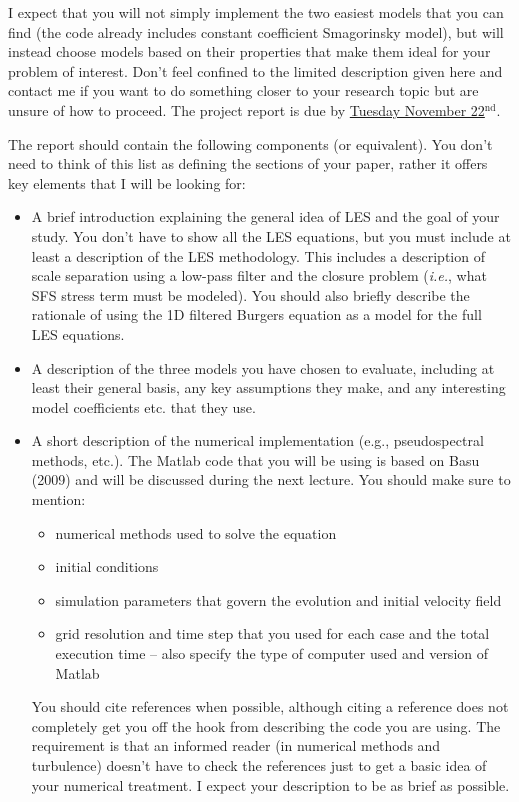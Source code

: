 \documentclass[11pt]{article}
\begin{document}
I expect that you will not simply implement the two easiest models that you can find (the code already includes constant coefficient Smagorinsky model), but will instead choose models based on their properties that make them ideal for your problem of interest. Don't feel confined to the limited description given here and contact me if you want to do something closer to your research topic but are unsure of how to proceed.   The project report is due by \underline{Tuesday November 22$^{\text{nd}}$}.

The report should contain the following components (or equivalent). You don't need to think of this list as defining the sections of your paper, rather it offers key elements that I will be looking for:
\begin{itemize}
\item A brief introduction explaining the general idea of LES and the goal of your study. You don't have to show all the LES equations, but you must include at least a description of the LES methodology. This includes a description of scale separation using a low-pass filter and the closure problem (\textit{i.e.}, what SFS stress term must be modeled). You should also briefly describe the rationale of using the 1D filtered Burgers equation as a model for the full LES equations.

\item A description of the three models you have chosen to evaluate, including at least their general basis, any key assumptions they make, and any interesting model coefficients etc. that they use.

\item A short description of the numerical implementation (e.g., pseudospectral methods, etc.).  The Matlab code that you will be using is based on Basu (2009) and will be discussed during the next lecture. You should make sure to mention:
\begin{itemize}
\item numerical methods used to solve the equation
\item initial conditions
\item simulation parameters that govern the evolution and initial velocity field
\item grid resolution and time step that you used for each case and the total execution time -- also specify the type of computer used and version of Matlab
\end{itemize}
You should cite references when possible, although citing a reference does not completely get you off the hook from describing the code you are using.  The requirement is that an informed reader (in numerical methods and turbulence) doesn't have to check the references just to get a basic idea of your numerical treatment. I expect your description to be as brief as possible.


\end{itemize}
\end{document}
